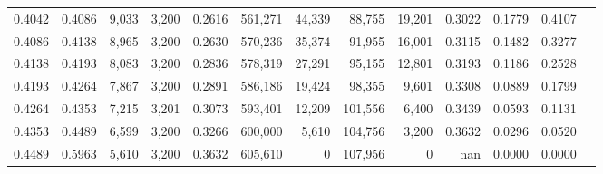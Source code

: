 \begin{tabular}{rrrrrrrrrrrrr}
0.4042 & 0.4086 &  9,033 & 3,200 &                                     0.2616 & 561,271 &  44,339 &  88,755 &  19,201 & 0.3022 & 0.1779 & 0.4107 \\
0.4086 & 0.4138 &  8,965 & 3,200 &                                     0.2630 & 570,236 &  35,374 &  91,955 &  16,001 & 0.3115 & 0.1482 & 0.3277 \\
0.4138 & 0.4193 &  8,083 & 3,200 &                                     0.2836 & 578,319 &  27,291 &  95,155 &  12,801 & 0.3193 & 0.1186 & 0.2528 \\
0.4193 & 0.4264 &  7,867 & 3,200 &                                     0.2891 & 586,186 &  19,424 &  98,355 &   9,601 & 0.3308 & 0.0889 & 0.1799 \\
0.4264 & 0.4353 &  7,215 & 3,201 &                                     0.3073 & 593,401 &  12,209 & 101,556 &   6,400 & 0.3439 & 0.0593 & 0.1131 \\
0.4353 & 0.4489 &  6,599 & 3,200 &                                     0.3266 & 600,000 &   5,610 & 104,756 &   3,200 & 0.3632 & 0.0296 & 0.0520 \\
0.4489 & 0.5963 &  5,610 & 3,200 &                                     0.3632 & 605,610 &       0 & 107,956 &       0 &    nan & 0.0000 & 0.0000 \\
\bottomrule
\end{tabular}
